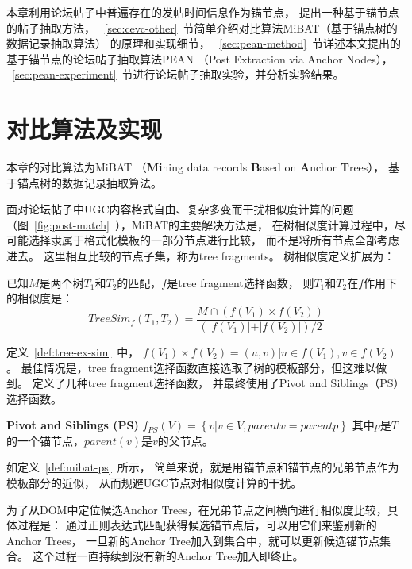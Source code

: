 本章利用论坛帖子中普遍存在的发帖时间信息作为锚节点，
提出一种基于锚节点的帖子抽取方法，
~\ref{sec:cevc-other}~节简单介绍对比算法MiBAT（基于锚点树的数据记录抽取算法）
的原理和实现细节，
~\ref{sec:pean-method}~节详述本文提出的基于锚节点的论坛帖子抽取算法PEAN
（Post Extraction via Anchor Nodes），
~\ref{sec:pean-experiment}~节进行论坛帖子抽取实验，并分析实验结果。

\section{对比算法及实现}
\label{sec:pean-other}

本章的对比算法为MiBAT
（\textbf{Mi}ning data records 
\textbf{B}ased on \textbf{A}nchor \textbf{T}rees），
基于锚点树的数据记录抽取算法。

面对论坛帖子中UGC内容格式自由、复杂多变而干扰相似度计算的问题
（图~\ref{fig:post-match}~），MiBAT的主要解决方法是，
在树相似度计算过程中，尽可能选择隶属于格式化模板的一部分节点进行比较，
而不是将所有节点全部考虑进去。
这里相互比较的节点子集，称为tree fragments。
树相似度定义扩展为：

\begin{definition}
\label{def:tree-ex-sim}
已知$M$是两个树$T_1$和$T_2$的匹配，$f$是tree fragment选择函数，
则$T_1$和$T_2$在$f$作用下的相似度是：
\begin{equation}
TreeSim_f(T_1, T_2) = \frac{M \cap (f(V_1) \times f(V_2))}
{(\vert f(V_1) \vert + \vert f(V_2) \vert) / 2}
\end{equation}
\end{definition}

定义~\ref{def:tree-ex-sim}~中，
$f(V_1) \times f(V_2) = {(u,v) \vert u \in f(V_1), v \in f(V_2)}$。
最佳情况是，tree fragment选择函数直接选取了树的模板部分，但这难以做到。
\cite{song2010automatic}定义了几种tree fragment选择函数，
并最终使用了Pivot and Siblings（PS）选择函数。

\begin{definition}
\label{def:mibat-ps}
\textbf{Pivot and Siblings (PS)}
$f_{PS}(V) = \left\{ v \vert v \in V, parent{v} = parent{p} \right\}$
其中$p$是$T$的一个锚节点，$parent(v)$是$v$的父节点。
\end{definition}

如定义~\ref{def:mibat-ps}~所示，
简单来说，就是用锚节点和锚节点的兄弟节点作为模板部分的近似，
从而规避UGC节点对相似度计算的干扰。

为了从DOM中定位候选Anchor Trees，在兄弟节点之间横向进行相似度比较，具体过程是：
通过正则表达式匹配获得候选锚节点后，可以用它们来鉴别新的Anchor Trees，
一旦新的Anchor Tree加入到集合中，就可以更新候选锚节点集合。
这个过程一直持续到没有新的Anchor Tree加入即终止。

